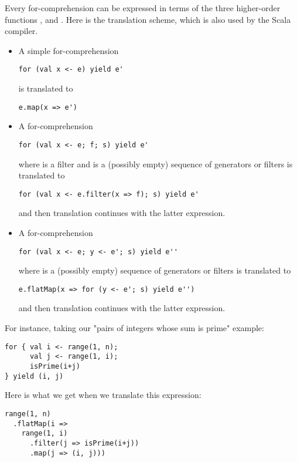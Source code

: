 \documentclass[a4paper,12pt,twoside,titlepage]{book}
\begin{document}
Every for-comprehension can be expressed in terms of the three
higher-order functions ,  and .
Here is the translation scheme, which is also used by the Scala compiler.
\begin{itemize}
\item
A simple for-comprehension
\begin{lstlisting}
for (val x <- e) yield e'
\end{lstlisting}
is translated to
\begin{lstlisting}
e.map(x => e')
\end{lstlisting}
\item
A for-comprehension
\begin{lstlisting}
for (val x <- e; f; s) yield e'
\end{lstlisting}
where  is a filter and  is a (possibly empty)
sequence of generators or filters
is translated to
\begin{lstlisting}
for (val x <- e.filter(x => f); s) yield e'
\end{lstlisting}
and then translation continues with the latter expression.
\item
A for-comprehension
\begin{lstlisting}
for (val x <- e; y <- e'; s) yield e''
\end{lstlisting}
where  is a (possibly empty)
sequence of generators or filters
is translated to
\begin{lstlisting}
e.flatMap(x => for (y <- e'; s) yield e'')
\end{lstlisting}
and then translation continues with the latter expression.
\end{itemize}
For instance, taking our "pairs of integers whose sum is prime" example:
\begin{lstlisting}
for { val i <- range(1, n);
      val j <- range(1, i);
      isPrime(i+j)
} yield (i, j)
\end{lstlisting}
Here is what we get when we translate this expression:
\begin{lstlisting}
range(1, n)
  .flatMap(i =>
    range(1, i)
      .filter(j => isPrime(i+j))
      .map(j => (i, j)))
\end{lstlisting}
\end{document}
